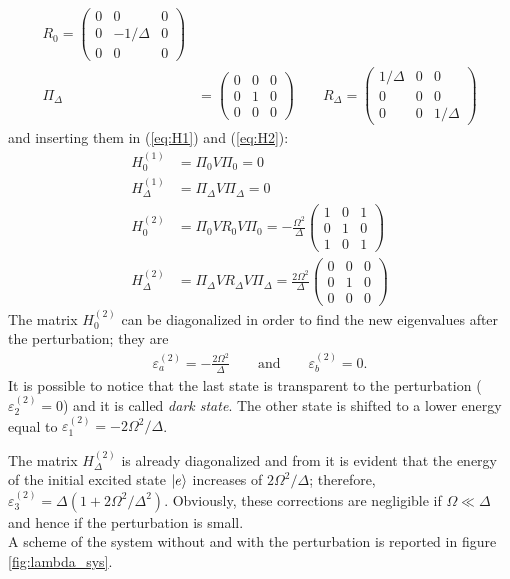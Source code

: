 \begin{tcolorbox}
\begin{align*}
    R_0 = \begin{pmatrix} 0 & 0 & 0 \\ 0 & -1/\Delta & 0 \\ 0 & 0 & 0 \end{pmatrix} \\ \Pi_\Delta &= \begin{pmatrix} 0 & 0 & 0 \\ 0 & 1 & 0 \\ 0 & 0 & 0 \end{pmatrix} 
    \qquad R_\Delta = \begin{pmatrix} 1/\Delta & 0 & 0 \\ 0 & 0 & 0 \\ 0 & 0 & 1/\Delta \end{pmatrix} 
\end{align*}
and inserting them in (\ref{eq:H1}) and (\ref{eq:H2}):
\begin{align*}
    H^{(1)}_0 &= \Pi_0 V \Pi_0 = 0 \\
    H^{(1)}_\Delta &= \Pi_\Delta V \Pi_\Delta = 0  \\
    H^{(2)}_0 &= \Pi_0 V R_0 V \Pi_0 = -\frac{\Omega^2}{\Delta} \begin{pmatrix} 1 & 0 & 1 \\ 0 & 1 & 0 \\ 1 & 0 & 1 \end{pmatrix} \\
    H^{(2)}_\Delta &= \Pi_\Delta V R_\Delta V \Pi_\Delta = \frac{2 \Omega^2}{\Delta} \begin{pmatrix} 0 & 0 & 0 \\ 0 & 1 & 0 \\ 0 & 0 & 0 \end{pmatrix} \label{eq:H_Delta}
\end{align*}
The matrix $H^{(2)}_0$ can be diagonalized in order to find the new eigenvalues after the perturbation; they are
\begin{align*}
    \varepsilon^{(2)}_a = -\frac{2 \Omega^2}{\Delta} \qquad \text{and} \qquad \varepsilon^{(2)}_b = 0.
\end{align*}
It is possible to notice that the last state is transparent to the perturbation ($\varepsilon_2^{(2)} = 0$) and it is called \textit{dark state}. The other state is shifted to a lower energy equal to $\varepsilon_1^{(2)} = -2 \Omega^2/\Delta$.

The matrix $H^{(2)}_\Delta$ is already diagonalized and from it is evident that the energy of the initial excited state $\ket{e}$ increases of $2 \Omega^2/\Delta$; therefore, $\varepsilon_3^{(2)} = \Delta\left( 1 + {2 \Omega^2}/{\Delta^2}\right)$. Obviously, these corrections are negligible if $\Omega \ll \Delta$ and hence if the perturbation is small.
\\

A scheme of the system without and with the perturbation is reported in figure \ref{fig:lambda_sys}. 
\end{tcolorbox}

